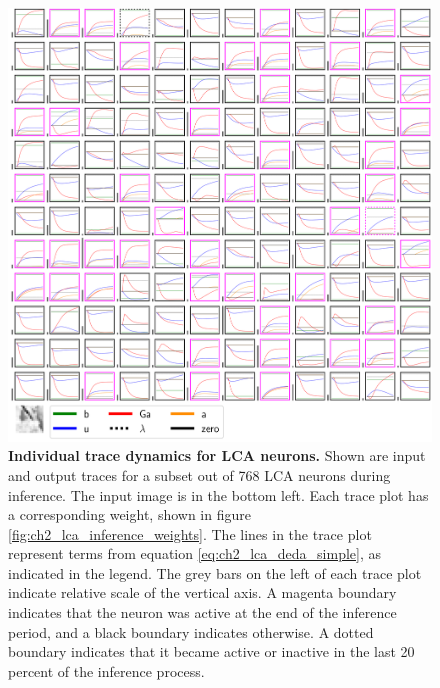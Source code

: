 \begin{figure}[h]
    \centering
    \includegraphics[width=\textwidth]{figures/lca_inference_traces.png}
    \caption{\textbf{Individual trace dynamics for LCA neurons.} Shown are input and output traces for a subset out of 768 LCA neurons during inference. The input image is in the bottom left. Each trace plot has a corresponding weight, shown in figure \ref{fig:ch2_lca_inference_weights}.  The lines in the trace plot represent terms from equation \eqref{eq:ch2_lca_deda_simple}, as indicated in the legend. The grey bars on the left of each trace plot indicate relative scale of the vertical axis. A magenta boundary indicates that the neuron was active at the end of the inference period, and a black boundary indicates otherwise. A dotted boundary indicates that it became active or inactive in the last 20 percent of the inference process.}
    \label{fig:ch2_lca_inference_traces}
\end{figure}


